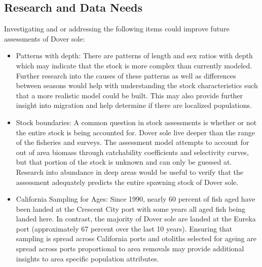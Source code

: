 \documentclass[11pt,
  english,
  a4paper,
]{article}
\begin{document}
\endgroup{}


\hypertarget{research-and-data-needs}{%
\subsection*{Research and Data Needs}\label{research-and-data-needs}}

\leavevmode\tagmcend\tagstructend


Investigating and or addressing the following items could improve future assessments of Dover sole:

\leavevmode\tagmcend\tagstructend\par

\begin{itemize}

\item Patterns with depth:  There are patterns of length and sex ratios with depth which may indicate that the stock is more complex than currently modeled.  Further research into the causes of these patterns as well as differences between seasons would help with understanding the stock characteristics such that a more realistic model could be built.  This may also provide further insight into migration and help determine if there are localized populations.

\item Stock boundaries: A common question in stock assessments is whether or not the entire stock is being accounted for. Dover sole live deeper than the range of the fisheries and surveys.  The assessment model attempts to account for out of area biomass through catchability coefficients and selectivity curves, but that portion of the stock is unknown and can only be guessed at.  Research into abundance in deep areas would be useful to verify that the assessment adequately predicts the entire spawning stock of Dover sole.

\item California Sampling for Ages: Since 1990, nearly 60 percent of fish aged have been landed at the Crescent City port with some years all aged fish being landed here. In contrast, the majority of Dover sole are landed at the Eureka port (approximately 67 percent over the last 10 years). Ensuring that sampling is spread across California ports and otoliths selected for ageing are spread across ports proportional to area removals may provide additional insights to area specific population attributes.

\end{itemize}
\end{document}

